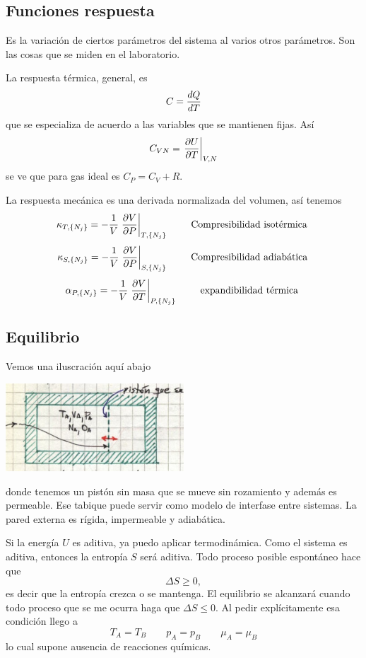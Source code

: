 \documentclass[10pt,oneside]{CBFT_book}
\begin{document}
\subsection{Funciones respuesta}

Es la variación de ciertos parámetros del sistema al varios otros parámetros.
Son las cosas que se miden en el laboratorio.

La respuesta térmica, general, es
\[
	C = \frac{d^{\hspace{-0.05em}} {Q}}{d {T}^{\hspace{-0.05em}}} 
\]
que se especializa de acuerdo a las variables que se mantienen fijas. Así
\[
	C_{VN} = \left.\frac{\partial^{\hspace{-0.05em}} {U}}{\partial {T}^{\hspace{-0.05em}}}\right|_{V,N}
\]
se ve que para gas ideal es $C_P = C_V + R$.

La respuesta mecánica es una derivada normalizada del volumen, así tenemos
\[
	\kappa_{T,\{ N_j \}} = - \frac{1}{V} \left.\frac{\partial^{\hspace{-0.05em}} {V}}{\partial {P}^{\hspace{-0.05em}}}\right|_{T,\{ N_j \}} \qquad 
	\text{ Compresibilidad isotérmica }
\]
\[
	\kappa_{S,\{ N_j \}} = - \frac{1}{V} \left.\frac{\partial^{\hspace{-0.05em}} {V}}{\partial {P}^{\hspace{-0.05em}}}\right|_{S,\{ N_j \}} \qquad 
	\text{ Compresibilidad adiabática }
\]
\[
	\alpha_{P,\{ N_j \}} = - \frac{1}{V} \left.\frac{\partial^{\hspace{-0.05em}} {V}}{\partial {T}^{\hspace{-0.05em}}}\right|_{P,\{ N_j \}} \qquad 
	\text{ expandibilidad térmica }
\]
\subsection{Equilibrio}

Vemos una iluscración aquí abajo

\includegraphics[width=0.50\textwidth]{images/1606329041.jpg}

donde tenemos un pistón sin masa que se mueve sin rozamiento y además es permeable.
Ese tabique puede servir como modelo de interfase entre sistemas. La pared externa
es rígida, impermeable y adiabática.

Si la energía $U$ es aditiva, ya puedo aplicar termodinámica. Como el sistema es
aditiva, entonces la entropía $S$ será aditiva. Todo proceso posible espontáneo
hace que
\[
	\Delta S \geq 0,
\]
es decir que la entropía crezca o se mantenga. El equilibrio se alcanzará cuando
todo proceso que se me ocurra haga que $\Delta S \leq 0$. Al pedir explícitamente
esa condición llego a
\[
	T_A = T_B \qquad  p_A = p_B \qquad \mu_A = \mu_B
\]
lo cual supone ausencia de reacciones químicas.
\end{document}
